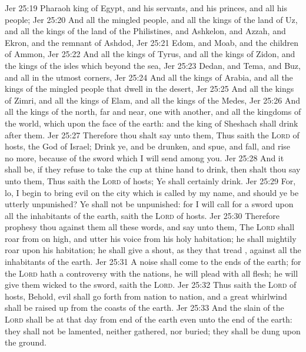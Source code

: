 \vs Jer 25:19 Pharaoh king of Egypt, and his servants, and his princes, and all his people;
\vs Jer 25:20 And all the mingled people, and all the kings of the land of Uz, and all the kings of the land of the Philistines, and Ashkelon, and Azzah, and Ekron, and the remnant of Ashdod,
\vs Jer 25:21 Edom, and Moab, and the children of Ammon,
\vs Jer 25:22 And all the kings of Tyrus, and all the kings of Zidon, and the kings of the isles which  beyond the sea,
\vs Jer 25:23 Dedan, and Tema, and Buz, and all  in the utmost corners,
\vs Jer 25:24 And all the kings of Arabia, and all the kings of the mingled people that dwell in the desert,
\vs Jer 25:25 And all the kings of Zimri, and all the kings of Elam, and all the kings of the Medes,
\vs Jer 25:26 And all the kings of the north, far and near, one with another, and all the kingdoms of the world, which  upon the face of the earth: and the king of Sheshach shall drink after them.
\vs Jer 25:27 Therefore thou shalt say unto them, Thus saith the \textsc{Lord} of hosts, the God of Israel; Drink ye, and be drunken, and spue, and fall, and rise no more, because of the sword which I will send among you.
\vs Jer 25:28 And it shall be, if they refuse to take the cup at thine hand to drink, then shalt thou say unto them, Thus saith the \textsc{Lord} of hosts; Ye shall certainly drink.
\vs Jer 25:29 For, lo, I begin to bring evil on the city which is called by my name, and should ye be utterly unpunished? Ye shall not be unpunished: for I will call for a sword upon all the inhabitants of the earth, saith the \textsc{Lord} of hosts.
\vs Jer 25:30 Therefore prophesy thou against them all these words, and say unto them, The \textsc{Lord} shall roar from on high, and utter his voice from his holy habitation; he shall mightily roar upon his habitation; he shall give a shout, as they that tread , against all the inhabitants of the earth.
\vs Jer 25:31 A noise shall come  to the ends of the earth; for the \textsc{Lord} hath a controversy with the nations, he will plead with all flesh; he will give them  wicked to the sword, saith the \textsc{Lord}.
\vs Jer 25:32 Thus saith the \textsc{Lord} of hosts, Behold, evil shall go forth from nation to nation, and a great whirlwind shall be raised up from the coasts of the earth.
\vs Jer 25:33 And the slain of the \textsc{Lord} shall be at that day from  end of the earth even unto the  end of the earth: they shall not be lamented, neither gathered, nor buried; they shall be dung upon the ground.
